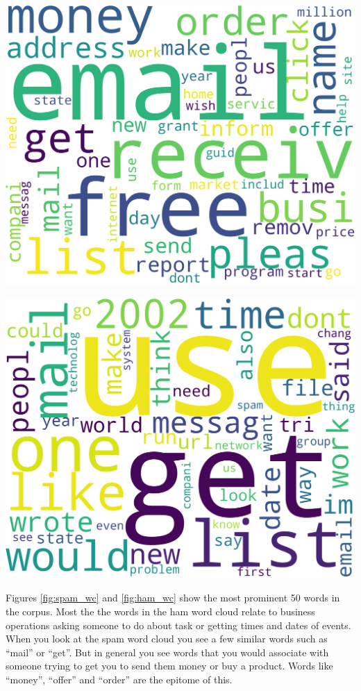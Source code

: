 \documentclass[12pt]{article}
\begin{document}
\begin{multicols}{2}
            \begin{minipage}{0.4\columnwidth}
                \includegraphics[width=\textwidth]{figures/spam_wc}
                \label{fig:spam_wc}
            \end{minipage}
            \begin{minipage}{0.4\columnwidth}
                \includegraphics[width=\textwidth]{figures/ham_wc}
                \label{fig:ham_wc}
             \end{minipage}
            
            
             Figures \ref{fig:spam_wc} and \ref{fig:ham_wc} show
             the most prominent 50 words in the corpus. Most the the words in the
             ham word cloud relate to business operations asking someone to do about
             task or getting times and dates of events. When you look at the spam
             word cloud you see a few similar words such as ``mail'' or ``get''.
             But in general you see words that you would associate with someone trying
             to get you to send them money or buy a product. Words like ``money'',
             ``offer'' and ``order'' are the epitome of this.


\end{multicols}
\end{document}
